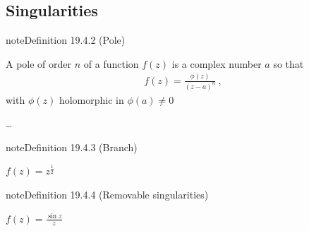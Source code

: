 \documentclass[letterpaper,10pt,english]{jupyterBook}
\begin{document}
\subsection{Singularities}
\label{\detokenize{ch/complex/analysis:singularities}}\label{\detokenize{ch/complex/analysis:complex-analysis-singularities}}\label{ch/complex/analysis:definition-2}
\begin{sphinxadmonition}{note}{Definition 19.4.2 (Pole)}



\sphinxAtStartPar
A pole of order \(n\) of a function \(f(z)\) is a complex number \(a\) so that
\begin{equation*}
\begin{split}f(z) = \frac{\phi(z)}{(z-a)^n} \ ,\end{split}
\end{equation*}
\sphinxAtStartPar
with \(\phi(z)\) holomorphic in \(\phi(a) \ne 0\)
\end{sphinxadmonition}

\sphinxAtStartPar
{} …
\label{ch/complex/analysis:definition-3}
\begin{sphinxadmonition}{note}{Definition 19.4.3 (Branch)}


\end{sphinxadmonition}

\sphinxAtStartPar
{} \(f(z) = z^{\frac{1}{2}}\)
\label{ch/complex/analysis:definition-4}
\begin{sphinxadmonition}{note}{Definition 19.4.4 (Removable singularities)}


\end{sphinxadmonition}

\sphinxAtStartPar
{} \(f(z) = \frac{\sin z}{z}\)

\sphinxAtStartPar
{}
\end{document}
